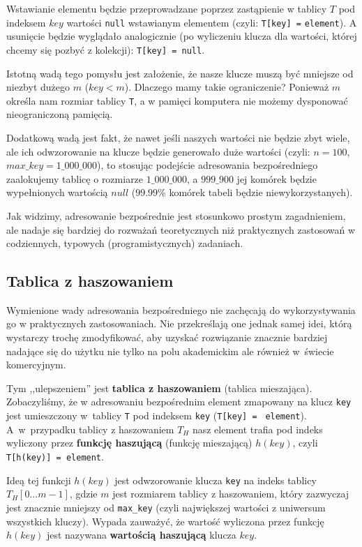 \documentclass[twoside]{article}
\begin{document}
Wstawianie elementu będzie przeprowadzane poprzez zastąpienie w tablicy $T$ pod indeksem $key$ wartości \verb|null| wstawianym elementem (czyli: \verb|T[key] =| \verb|element|).
A usunięcie będzie wyglądało analogicznie (po wyliczeniu klucza dla wartości, której chcemy się pozbyć z kolekcji): \verb|T[key] = null|.

Istotną wadą tego pomysłu jest założenie, że nasze klucze muszą być mniejsze od niezbyt dużego $m$ ($key < m$). Dlaczego mamy takie ograniczenie? Ponieważ $m$ określa nam rozmiar tablicy \verb|T|,
a w pamięci komputera nie możemy dysponować nieograniczoną pamięcią.

Dodatkową wadą jest fakt, że nawet jeśli naszych wartości nie będzie zbyt wiele, ale ich 
odwzorowanie na klucze będzie generowało duże wartości (czyli: $n=100$, $max\_key=1\_000\_000$),
to stosując podejście adresowania bezpośredniego zaalokujemy tablicę o rozmiarze $1\_000\_000$,
a $999\_900$ jej komórek będzie wypełnionych wartością $null$ ($99.99\%$ komórek tabeli będzie
niewykorzystanych).

Jak widzimy, adresowanie bezpośrednie jest stosunkowo prostym zagadnieniem, ale nadaje się
bardziej do rozważań teoretycznych niż praktycznych zastosowań w codziennych, typowych
(programistycznych) zadaniach.

\subsection{Tablica z haszowaniem}
Wymienione wady adresowania bezpośredniego nie zachęcają do wykorzystywania go w praktycznych 
zastosowaniach.
Nie przekreślają one jednak samej idei, którą wystarczy trochę zmodyfikować, aby uzyskać rozwiązanie
znacznie bardziej nadające się do użytku nie tylko na polu akademickim ale również w~świecie
komercyjnym.

Tym ,,ulepszeniem'' jest \textbf{tablica z haszowaniem} (tablica mieszająca).
Zobaczyliśmy, że w adresowaniu bezpośrednim element zmapowany na klucz \verb|key| jest umieszczony
w~tablicy \verb|T| pod indeksem \verb|key| (\verb|T[key] = | \verb|element|). 
A~w~przypadku tablicy z haszowaniem $T_H$ nasz element trafia pod indeks wyliczony przez 
\textbf{funkcję haszującą} (funkcję mieszającą) $h(key)$, czyli \verb|T[h(key)] = element|.

Ideą tej funkcji $h(key)$ jest odwzorowanie klucza \verb|key| na indeks tablicy $T_H[0...m-1]$, 
gdzie $m$ jest rozmiarem tablicy z haszowaniem, który zazwyczaj jest znacznie mniejszy
od \verb|max_key| (czyli największej wartości z uniwersum wszystkich kluczy).
Wypada zauważyć, że wartość wyliczona przez funkcję $h(key)$ jest nazywana 
\textbf{wartością haszującą} klucza $key$.
\end{document}
